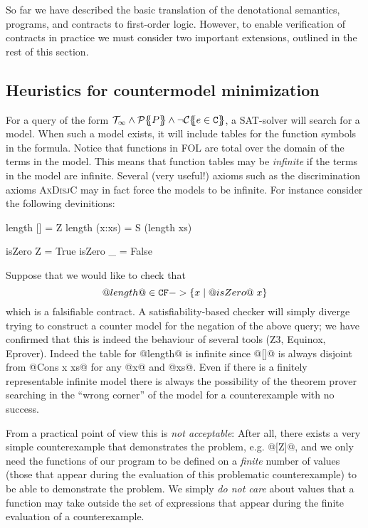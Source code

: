\newcommand{\ThMin}{\Th_{\infty}^{min}}

So far we have described the basic translation of the denotational semantics, programs, and contracts
to first-order logic. However, to enable verification of contracts in practice we must consider two 
important extensions, outlined in the rest of this section.

\subsection{Heuristics for countermodel minimization}\label{sect:minimization}

For a query of the form $\Th_{\infty} \land \ptrans{}{P} \land \neg \ctrans{}{P}{e \in \Ct}$, a SAT-solver will search
for a model. When such a model exists, it will include tables for the function symbols in the formula. Notice that functions 
in FOL are total over the domain of the terms in the model. This means that function tables may be {\em infinite} if the 
terms in the model are infinite. Several (very useful!) axioms such as the discrimination axioms \textsc{AxDisjC} may in 
fact force the models to be infinite. For instance consider the following devinitions:
\begin{code}
length [] = Z
length (x:xs) = S (length xs)

isZero Z = True
isZero _ = False
\end{code}
Suppose that we would like to check that 
   \[ @length@ \in {\tt CF} -> \{ x \mid @isZero@\;x\} \]
which is a falsifiable contract.  A satisfiability-based checker 
will simply diverge trying to construct a counter model for the negation of the above query; we 
have confirmed that this is indeed the behaviour of several tools (Z3, Equinox, Eprover).
Indeed the table for @length@ is infinite since @[]@ is always disjoint from @Cons x xs@ for 
any @x@ and @xs@. Even if there is a finitely representable infinite model there is always the 
possibility of the theorem prover searching in the ``wrong corner'' of the model for a 
counterexample with no success. 

From a practical point of view this is {\em not acceptable}: After all, there exists a very simple 
counterexample that demonstrates the problem, e.g. @[Z]@, and we only need the 
functions of our program to be defined on a {\em finite} number of values (those that appear 
during the evaluation of this problematic counterexample) to be able to demonstrate 
the problem. We simply {\em do not care} about values that a function may take outside 
the set of expressions that appear during the finite evaluation of a counterexample.

